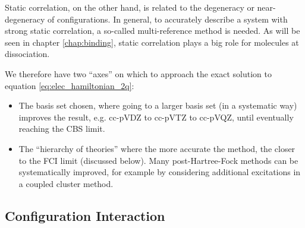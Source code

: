 Static correlation, on the other hand, is related to the degeneracy or near-degeneracy of configurations. In general, to accurately describe a system with strong static correlation, a so-called multi-reference method is needed. As will be seen in chapter \ref{chap:binding}, static correlation plays a big role for molecules at dissociation.

We therefore have two ``axes'' on which to approach the exact solution to equation \eqref{eq:elec_hamiltonian_2q}:
\begin{itemize}
    \item The basis set chosen, where going to a larger basis set (in a systematic way) improves the result, e.g. cc-pVDZ to cc-pVTZ to cc-pVQZ, until eventually reaching the \gls{CBS} limit.
    \item The ``hierarchy of theories'' where the more accurate the method, the closer to the \gls{FCI} limit (discussed below). Many post-Hartree-Fock methods can be systematically improved, for example by considering additional excitations in a coupled cluster method.
\end{itemize}




\subsection{Configuration Interaction}
\label{sec:ci}

